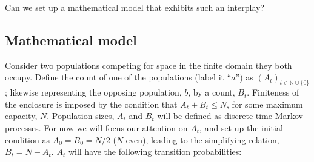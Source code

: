 \noindent
Can we set up a mathematical model that exhibits such an interplay?\\

\subsection*{Mathematical model}
\noindent
Consider two populations competing for space in the finite domain they both occupy. Define the count of one of the populations (label it ``$a$'') as $(A_t)_{t\in\mathbb{N}\cup \{0\}}$; likewise representing the opposing population, $b$, by a count, $B_t$. Finiteness of the enclosure is imposed by the condition that $A_t + B_t \leq N$, for some maximum capacity, $N$. Population sizes, $A_t$ and $B_t$ will be defined as discrete time Markov processes. For now we will focus our attention on $A_t$, and set up the initial condition as $A_0 = B_0 = N/2$ ($N$ even), leading to the simplifying relation, $B_t = N - A_t$. $A_t$ will have the following transition probabilities:

